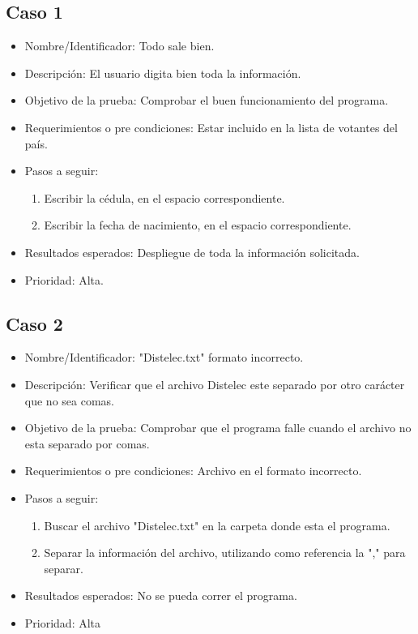 \documentclass[conference]{IEEEtran}
\begin{document}
\subsection{Caso 1}
\begin{itemize}
\item Nombre/Identificador: Todo sale bien.
\item Descripción: El usuario digita bien toda la información.
\item Objetivo de la prueba: Comprobar el buen funcionamiento del programa.
\item Requerimientos o pre condiciones: Estar incluido en la lista de votantes del país.
\item Pasos a seguir: 
\begin{enumerate}
\item Escribir la cédula, en el espacio correspondiente.
\item Escribir la fecha de nacimiento, en el espacio correspondiente.
\end{enumerate}
\item Resultados esperados: Despliegue de toda la información solicitada.
\item Prioridad: Alta.
\end{itemize}

\subsection{Caso 2}
\begin{itemize}
\item Nombre/Identificador: "Distelec.txt" formato incorrecto.
\item Descripción: Verificar que el archivo Distelec este separado por otro carácter que no sea comas.
\item Objetivo de la prueba: Comprobar que el programa falle cuando el archivo no esta separado por comas. 
\item Requerimientos o pre condiciones: Archivo en el formato incorrecto.
\item Pasos a seguir: 
\begin{enumerate}
\item Buscar el archivo "Distelec.txt" en la carpeta donde esta el programa.
\item Separar la información del archivo, utilizando como referencia la "," para separar.
\end{enumerate}
\item Resultados esperados: No se pueda correr el programa.
\item Prioridad: Alta
\end{itemize}
\end{document}
